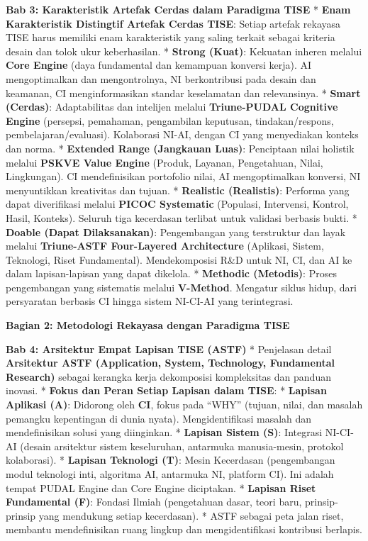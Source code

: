 \documentclass[
  letterpaper,
  DIV=11,
  numbers=noendperiod]{scrreprt}
\begin{document}
\textbf{Bab 3: Karakteristik Artefak Cerdas dalam Paradigma TISE} *
\textbf{Enam Karakteristik Distingtif Artefak Cerdas TISE}: Setiap
artefak rekayasa TISE harus memiliki enam karakteristik yang saling
terkait sebagai kriteria desain dan tolok ukur keberhasilan. *
\textbf{Strong (Kuat)}: Kekuatan inheren melalui \textbf{Core Engine}
(daya fundamental dan kemampuan konversi kerja). AI mengoptimalkan dan
mengontrolnya, NI berkontribusi pada desain dan keamanan, CI
menginformasikan standar keselamatan dan relevansinya. * \textbf{Smart
(Cerdas)}: Adaptabilitas dan intelijen melalui \textbf{Triune-PUDAL
Cognitive Engine} (persepsi, pemahaman, pengambilan keputusan,
tindakan/respons, pembelajaran/evaluasi). Kolaborasi NI-AI, dengan CI
yang menyediakan konteks dan norma. * \textbf{Extended Range (Jangkauan
Luas)}: Penciptaan nilai holistik melalui \textbf{PSKVE Value Engine}
(Produk, Layanan, Pengetahuan, Nilai, Lingkungan). CI mendefinisikan
portofolio nilai, AI mengoptimalkan konversi, NI menyuntikkan
kreativitas dan tujuan. * \textbf{Realistic (Realistis)}: Performa yang
dapat diverifikasi melalui \textbf{PICOC Systematic} (Populasi,
Intervensi, Kontrol, Hasil, Konteks). Seluruh tiga kecerdasan terlibat
untuk validasi berbasis bukti. * \textbf{Doable (Dapat Dilaksanakan)}:
Pengembangan yang terstruktur dan layak melalui \textbf{Triune-ASTF
Four-Layered Architecture} (Aplikasi, Sistem, Teknologi, Riset
Fundamental). Mendekomposisi R\&D untuk NI, CI, dan AI ke dalam
lapisan-lapisan yang dapat dikelola. * \textbf{Methodic (Metodis)}:
Proses pengembangan yang sistematis melalui \textbf{V-Method}. Mengatur
siklus hidup, dari persyaratan berbasis CI hingga sistem NI-CI-AI yang
terintegrasi.

\textbf{Bagian 2: Metodologi Rekayasa dengan Paradigma TISE}

\textbf{Bab 4: Arsitektur Empat Lapisan TISE (ASTF)} * Penjelasan detail
\textbf{Arsitektur ASTF (Application, System, Technology, Fundamental
Research)} sebagai kerangka kerja dekomposisi kompleksitas dan panduan
inovasi. * \textbf{Fokus dan Peran Setiap Lapisan dalam TISE}: *
\textbf{Lapisan Aplikasi (A)}: Didorong oleh \textbf{CI}, fokus pada
``WHY'' (tujuan, nilai, dan masalah pemangku kepentingan di dunia
nyata). Mengidentifikasi masalah dan mendefinisikan solusi yang
diinginkan. * \textbf{Lapisan Sistem (S)}: Integrasi NI-CI-AI (desain
arsitektur sistem keseluruhan, antarmuka manusia-mesin, protokol
kolaborasi). * \textbf{Lapisan Teknologi (T)}: Mesin Kecerdasan
(pengembangan modul teknologi inti, algoritma AI, antarmuka NI, platform
CI). Ini adalah tempat PUDAL Engine dan Core Engine diciptakan. *
\textbf{Lapisan Riset Fundamental (F)}: Fondasi Ilmiah (pengetahuan
dasar, teori baru, prinsip-prinsip yang mendukung setiap kecerdasan). *
ASTF sebagai peta jalan riset, membantu mendefinisikan ruang lingkup dan
mengidentifikasi kontribusi berlapis.
\end{document}
